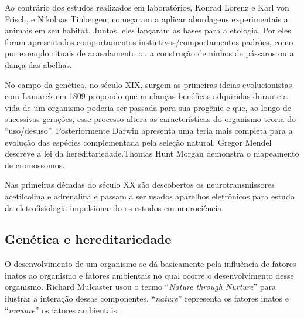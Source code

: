 \documentclass[
	article,			%
	12pt,				%
	oneside,			%
	a4paper,			%
	english,			%
	brazil,				%
	sumario=tradicional
	]{abntex2}
\begin{document}
Ao contrário dos estudos realizados em laboratórios, Konrad Lorenz e Karl von Frisch, e Nikolaas Tinbergen, começaram a aplicar abordagens experimentais a animais em seu habitat. Juntos, eles lançaram as bases para a etologia.%
Por eles foram apresentados comportamentos instintivos/comportamentos padrões, como por exemplo rituais de acasalamento ou a construção de ninhos de pássaros ou a dança das abelhas.

No campo da genética, no século XIX, surgem as primeiras ideias evolucionistas com Lamarck em 1809 propondo que mudanças benéficas adquiridas durante a vida de um organismo poderia ser passada para sua progênie e que, ao longo de sucessivas gerações, esse processo altera as características do organismo teoria do ``uso/desuso''. Posteriormente Darwin apresenta uma teria mais completa para a evolução das espécies complementada pela seleção natural.
Gregor	Mendel descreve a lei da hereditariedade.Thomas Hunt Morgan demonstra o mapeamento de cromossomos.

Nas primeiras décadas do século XX são descobertos os neurotransmissores acetilcolina e adrenalina e passam a ser usados aparelhos eletrônicos para estudo da eletrofisiologia impulsionando os estudos em neurociência.

\subsection{Genética e hereditariedade}


O desenvolvimento de um organismo se dá basicamente pela influência de fatores inatos ao organismo e fatores ambientais no qual ocorre o desenvolvimento desse organismo. Richard Mulcaster usou o termo ``\textit{Nature through Nurture}'' para ilustrar a interação dessas componentes, ``\textit{nature}'' representa os fatores inatos e ``\textit{nurture}'' os fatores ambientais.
\end{document}

